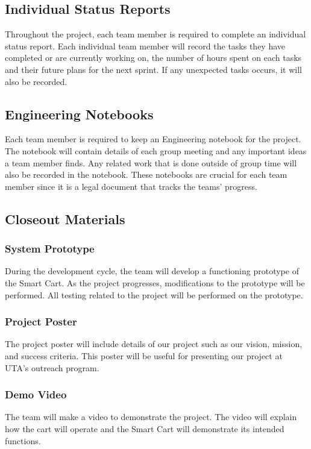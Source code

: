 \subsection{Individual Status Reports}
Throughout the project, each team member is required to complete an individual status report. Each individual team member will record the tasks they have completed or are currently working on, the number of hours spent on each tasks and their future plans for the next sprint. If any unexpected tasks occurs, it will also be recorded.

\subsection{Engineering Notebooks}
Each team member is required to keep an Engineering notebook for the project. The notebook will contain details of each group meeting and any important ideas a team member finds. Any related work that is done outside of group time will also be recorded in the notebook. These notebooks are crucial for each team member since it is a legal document that tracks the teams' progress. 

\subsection{Closeout Materials}
\subsubsection{System Prototype}
During the development cycle, the team will develop a functioning prototype of the Smart Cart. As the project progresses, modifications to the prototype will be performed. All testing related to the project will be performed on the prototype. 

\subsubsection{Project Poster}
The project poster will include details of our project such as our vision, mission, and success criteria. This poster will be useful for presenting our project at UTA's outreach program.

\subsubsection{Demo Video}
The team will make a video to demonstrate the project. The video will explain how the cart will operate and the Smart Cart will demonstrate its intended functions.

